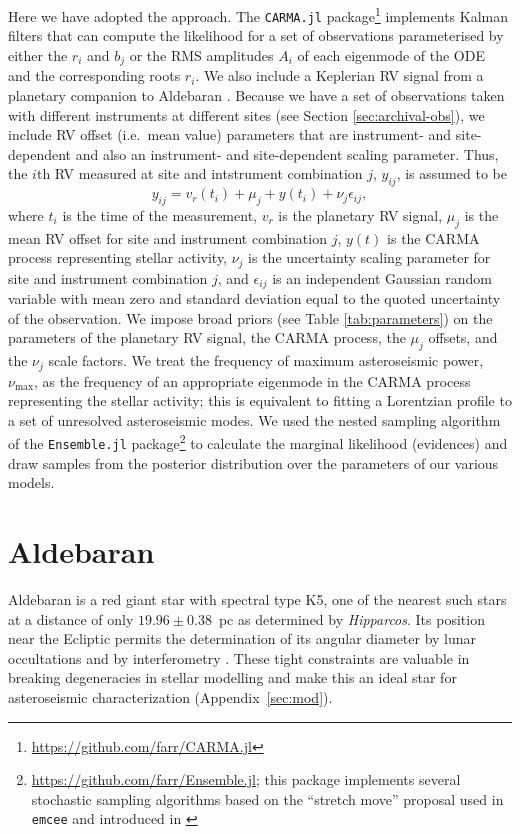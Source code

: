 \documentclass[modern]{aastex61}
\newcommand{\hipparcos}{\emph{Hipparcos}\xspace}
\begin{document}
Here we have adopted the \citet{Kelly2014} approach.  The \texttt{CARMA.jl}
package\footnote{\url{https://github.com/farr/CARMA.jl}} implements Kalman
filters that can compute the likelihood for a set of observations parameterised
by either the $r_i$ and $b_j$ or the RMS amplitudes $A_i$ of each eigenmode of
the ODE and the corresponding roots $r_i$.  We also include a Keplerian RV
signal from a planetary companion to Aldebaran \citep{Hatzes2015,Gregory2005}.
Because we have a set of observations taken with different instruments at
different sites (see Section \ref{sec:archival-obs}), we include RV offset
(i.e.\ mean value) parameters that are instrument- and site-dependent and also
an instrument- and site-dependent scaling parameter.  Thus, the $i$th RV
measured at site and intstrument combination $j$, $y_{ij}$, is assumed to be
%
\begin{equation}
  \label{eq:RV-model}
  y_{ij} = v_r\left(t_i\right) + \mu_j + y\left( t_i \right) + \nu_j
\epsilon_{ij},
\end{equation}
%
where $t_i$ is the time of the measurement, $v_r$ is the planetary RV signal,
$\mu_j$ is the mean RV offset for site and instrument combination $j$, $y(t)$ is
the CARMA process representing stellar activity, $\nu_j$ is the uncertainty
scaling parameter for site and instrument combination $j$, and $\epsilon_{ij}$
is an independent Gaussian random variable with mean zero and standard deviation
equal to the quoted uncertainty of the observation.  We impose broad priors (see
Table \ref{tab:parameters}) on the parameters of the planetary RV signal, the
CARMA process, the $\mu_j$ offsets, and the $\nu_j$ scale factors.  We treat the
frequency of maximum asteroseismic power, $\nu_\mathrm{max}$, as the frequency
of an appropriate eigenmode in the CARMA process representing the stellar
activity; this is equivalent to fitting a Lorentzian profile to a set of
unresolved asteroseismic modes.  We used the nested sampling algorithm of the
\texttt{Ensemble.jl} package\footnote{\url{https://github.com/farr/Ensemble.jl};
this package implements several stochastic sampling algorithms based on the
``stretch move'' proposal used in \texttt{emcee} \citep{Foreman-Mackey2013} and
introduced in \citet{Goodman2010}} to calculate the marginal likelihood
(evidences) and draw samples from the posterior distribution over the parameters
of our various models.

\section{Aldebaran}
Aldebaran is a red giant star with spectral type K5, one of the nearest such stars at a distance of only $19.96 \pm 0.38$~pc as determined by \hipparcos \citep{hipparcos}. Its position near the Ecliptic permits the determination of its angular diameter by lunar occultations and by interferometry \citep[$20.58 \pm 0.03$ mas;][]{richichi2005,1979ApJ...228L.111B,brown1979,panek1980}. These tight constraints are valuable in breaking degeneracies in stellar modelling and make this an ideal star for asteroseismic characterization (Appendix~\ref{sec:mod}).
\end{document}
